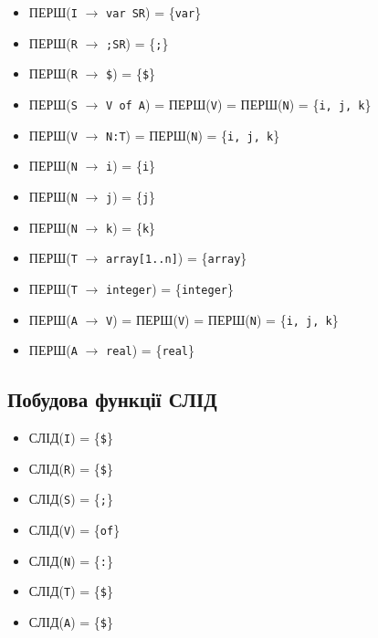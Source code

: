 \begin{itemize}
    \item  ПЕРШ(\verb|I| $\to$ \verb|var SR|) = \{\verb|var|\}
    \item  ПЕРШ(\verb|R| $\to$ \verb|;SR|) = \{\verb|;|\}
    \item  ПЕРШ(\verb|R| $\to$ \verb|$|) = \{\verb|$|\}
    \item  ПЕРШ(\verb|S| $\to$ \verb|V of A|) = ПЕРШ(\verb|V|) = ПЕРШ(\verb|N|) = \{\verb|i, j, k|\}
    \item  ПЕРШ(\verb|V| $\to$ \verb|N:T|) = ПЕРШ(\verb|N|) = \{\verb|i, j, k|\}
    \item  ПЕРШ(\verb|N| $\to$ \verb|i|) = \{\verb|i|\}
    \item  ПЕРШ(\verb|N| $\to$ \verb|j|) = \{\verb|j|\}
    \item  ПЕРШ(\verb|N| $\to$ \verb|k|) = \{\verb|k|\}
    \item  ПЕРШ(\verb|T| $\to$ \verb|array[1..n]|) = \{\verb|array|\}
    \item  ПЕРШ(\verb|T| $\to$ \verb|integer|) = \{\verb|integer|\}
    \item  ПЕРШ(\verb|A| $\to$ \verb|V|) = ПЕРШ(\verb|V|) = ПЕРШ(\verb|N|) = \{\verb|i, j, k|\}
    \item  ПЕРШ(\verb|A| $\to$ \verb|real|) = \{\verb|real|\}
\end{itemize}

\subsection{Побудова функції СЛІД}
\begin{itemize}
    \item  СЛІД(\verb|I|) = \{\verb|$|\}
    \item  СЛІД(\verb|R|) = \{\verb|$|\}
    \item  СЛІД(\verb|S|) = \{\verb|;|\}
    \item  СЛІД(\verb|V|) = \{\verb|of|\}
    \item  СЛІД(\verb|N|) = \{\verb|:|\}
    \item  СЛІД(\verb|T|) = \{\verb|$|\}
    \item  СЛІД(\verb|A|) = \{\verb|$|\}
\end{itemize}

